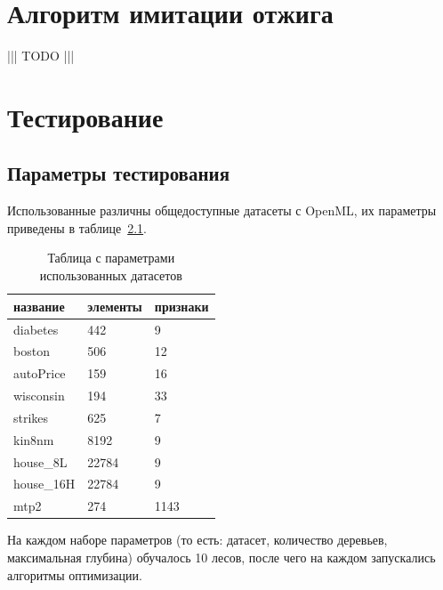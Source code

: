 \documentclass[pscyr,specification,annotation]{itmo-student-thesis}
\begin{document}
\chapter{Алгоритм имитации отжига}

 ||| TODO |||

\chapter{Тестирование}
\section{Параметры тестирования}

Использованные различны общедоступные датасеты с OpenML, их параметры приведены
в таблице~\ref{tab1}.

\begin{center}
    \begin{table}[!h]
    \caption{Таблица с параметрами использованных датасетов}\label{tab1}
    \begin{tabular}{|l|l|l|}

    \hline

    название        & элементы  & признаки \\

    \hline

    diabetes        & 442    & 9     \\
    boston          & 506    & 12    \\
    autoPrice       & 159    & 16    \\
    wisconsin       & 194    & 33    \\
    strikes         & 625    & 7     \\
    kin8nm          & 8192   & 9     \\
    house\_8L       & 22784  & 9     \\
    house\_16H      & 22784  & 9     \\
    mtp2            & 274    & 1143  \\

    \hline

    \end{tabular}
    \end{table}
\end{center}

На каждом наборе параметров (то есть: датасет, количество деревьев, максимальная
глубина) обучалось 10 лесов, после чего на каждом запускались алгоритмы
оптимизации.
\end{document}
